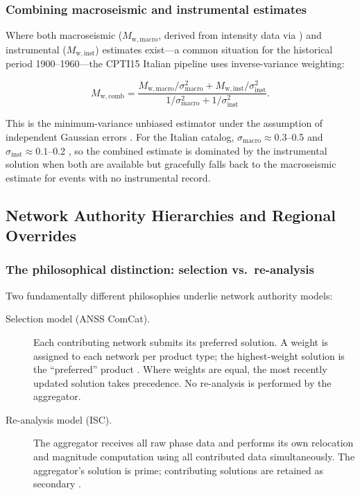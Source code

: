 \documentclass[12pt]{article}
\newcommand{\catalog}{catalog}
\begin{document}
\subsubsection{Combining macroseismic and instrumental estimates}

Where both macroseismic ($M_{\mathrm{w,macro}}$, derived from intensity data
via \citealt{Grunthal1998}) and instrumental ($M_{\mathrm{w,inst}}$) estimates
exist—a common situation for the historical period 1900--1960—the CPTI15
Italian pipeline \citep{CPTI15} uses inverse-variance weighting:

\begin{equation}
  M_{\mathrm{w,comb}} = \frac{
    M_{\mathrm{w,macro}} / \sigma_{\mathrm{macro}}^2
    + M_{\mathrm{w,inst}} / \sigma_{\mathrm{inst}}^2
  }{
    1/\sigma_{\mathrm{macro}}^2 + 1/\sigma_{\mathrm{inst}}^2
  }.
  \label{eq:ivw}
\end{equation}

This is the minimum-variance unbiased estimator under the assumption of
independent Gaussian errors \citep{Kay1993}.  For the Italian \catalog,
$\sigma_{\mathrm{macro}} \approx 0.3$--0.5 and
$\sigma_{\mathrm{inst}} \approx 0.1$--0.2 \citep{CPTI15}, so the combined
estimate is dominated by the instrumental solution when both are available but
gracefully falls back to the macroseismic estimate for events with no
instrumental record.

\subsection{Network Authority Hierarchies and Regional Overrides}
\label{sec:authority}

\subsubsection{The philosophical distinction: selection vs.\ re-analysis}

Two fundamentally different philosophies underlie network authority models:

\begin{description}
  \item[Selection model (ANSS ComCat).] Each contributing network submits its
        preferred solution.  A weight is assigned to each network per product
        type; the highest-weight solution is the ``preferred'' product
        \citep{usgs_comcat}.  Where weights are equal, the most recently updated
        solution takes precedence.  No re-analysis is performed by the
        aggregator.

  \item[Re-analysis model (ISC).] The aggregator receives all raw phase data
        and performs its own relocation and magnitude computation using all
        contributed data simultaneously.  The aggregator's solution is prime;
        contributing solutions are retained as secondary
        \citep{ISCBulletinRebuild2020}.
\end{description}
\end{document}
